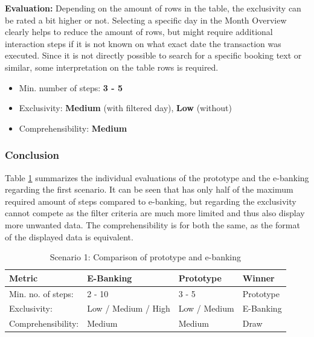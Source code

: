 \textbf{Evaluation:} Depending on the amount of rows in the table, the exclusivity can be rated a bit higher or not. Selecting a specific day in the Month Overview clearly helps to reduce the amount of rows, but might require additional interaction steps if it is not known on what exact date the transaction was executed. Since it is not directly possible to search for a specific booking text or similar, some interpretation on the table rows is required.
\begin{itemize}[noitemsep,nolistsep]
	\item Min. number of steps: \textbf{3 - 5}
	\item Exclusivity: \textbf{Medium} (with filtered day), \textbf{Low} (without)
	\item Comprehensibility: \textbf{Medium}
\end{itemize}



\subsubsection{Conclusion}

Table \ref{tbl:scenarioonecomparison} summarizes the individual evaluations of the prototype and the e-banking regarding the first scenario. It can be seen that has only half of the maximum required amount of steps compared to e-banking, but regarding the exclusivity cannot compete as the filter criteria are much more limited and thus also display more unwanted data. The comprehensibility is for both the same, as the format of the displayed data is equivalent.
\begin{table}[h]
	\begin{center}
		\begin{tabular}{ | p{3.2cm} | p{3.8cm} | p{3.5cm} | p{2.5cm} | }
			\hline
			\textbf{Metric} & \textbf{E-Banking} & \textbf{Prototype} & \textbf{Winner} \\
			\hline
				Min. no. of steps: & 2 - 10 & 3 - 5 & Prototype \\
			\hline
				Exclusivity: & Low / Medium / High & Low / Medium & E-Banking \\
			\hline
				Comprehensibility: & Medium & Medium & Draw \\
			\hline
		\end{tabular}
		\caption{Scenario 1: Comparison of prototype and e-banking}
		\label{tbl:scenarioonecomparison}
	\end{center}
\end{table}


